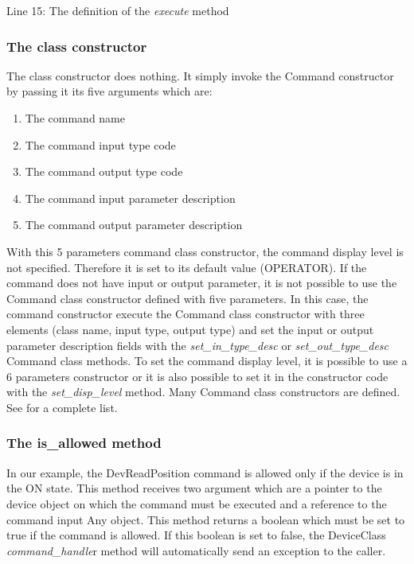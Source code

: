 Line 15: The definition of the \emph{execute} method


\subsubsection{The class constructor}

The class constructor does nothing. It simply invoke the Command
constructor by passing it its five arguments which are:
\begin{enumerate}
\item The command name
\item The command input type code
\item The command output type code
\item The command input parameter description
\item The command output parameter description
\end{enumerate}
With this 5 parameters command class constructor, the command display
level is not specified. Therefore it is set to its default value (OPERATOR).
If the command does not have input or output parameter, it is not
possible to use the Command class constructor defined with five parameters.
In this case, the command constructor execute the Command class constructor
with three elements (class name, input type, output type) and set
the input or output parameter description fields with the \emph{set\_in\_type\_desc}
or \emph{set\_out\_type\_desc} Command class
methods. To set the command display level, it is possible to use a
6 parameters constructor or it is also possible to set it in the constructor
code with the \emph{set\_disp\_level} method.
Many Command class constructors are defined. See \cite{TANGO_ref_man}for
a complete list.


\subsubsection{The is\_allowed method}

In our example, the DevReadPosition command is allowed only if the
device is in the ON state. This method receives two argument which
are a pointer to the device object on which the command must be executed
and a reference to the command input Any object. This method returns
a boolean which must be set to true if the command is allowed. If
this boolean is set to false, the DeviceClass
\emph{command\_handle}r method will automatically
send an exception to the caller.

